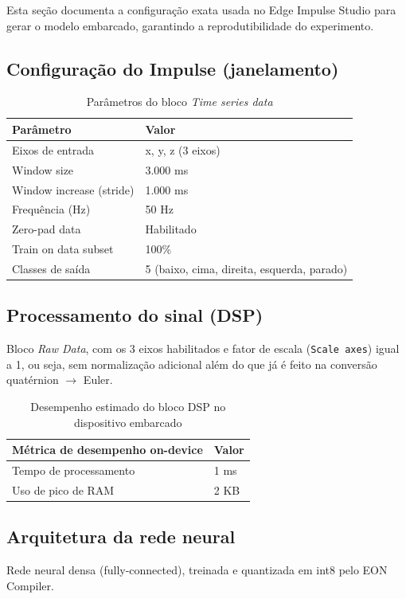 \documentclass[11pt,a4paper]{article}
\begin{document}
Esta seção documenta a configuração exata usada no Edge Impulse Studio para gerar o modelo embarcado, garantindo a reprodutibilidade do experimento.

\subsection{Configuração do Impulse (janelamento)}
\begin{table}[h]
\centering
\begin{tabular}{ll}
\toprule
\textbf{Parâmetro} & \textbf{Valor} \\
\midrule
Eixos de entrada & x, y, z (3 eixos) \\
Window size & 3.000 ms \\
Window increase (stride) & 1.000 ms \\
Frequência (Hz) & 50 Hz \\
Zero-pad data & Habilitado \\
Train on data subset & 100\% \\
Classes de saída & 5 (baixo, cima, direita, esquerda, parado) \\
\bottomrule
\end{tabular}
\caption{Parâmetros do bloco \emph{Time series data}}
\end{table}

\subsection{Processamento do sinal (DSP)}
Bloco \emph{Raw Data}, com os 3 eixos habilitados e fator de escala (\texttt{Scale axes}) igual a 1, ou seja, sem normalização adicional além do que já é feito na conversão quatérnion $\rightarrow$ Euler.

\begin{table}[h]
\centering
\begin{tabular}{ll}
\toprule
\textbf{Métrica de desempenho on-device} & \textbf{Valor} \\
\midrule
Tempo de processamento & 1 ms \\
Uso de pico de RAM & 2 KB \\
\bottomrule
\end{tabular}
\caption{Desempenho estimado do bloco DSP no dispositivo embarcado}
\end{table}

\subsection{Arquitetura da rede neural}
Rede neural densa (fully-connected), treinada e quantizada em int8 pelo EON Compiler.
\end{document}
